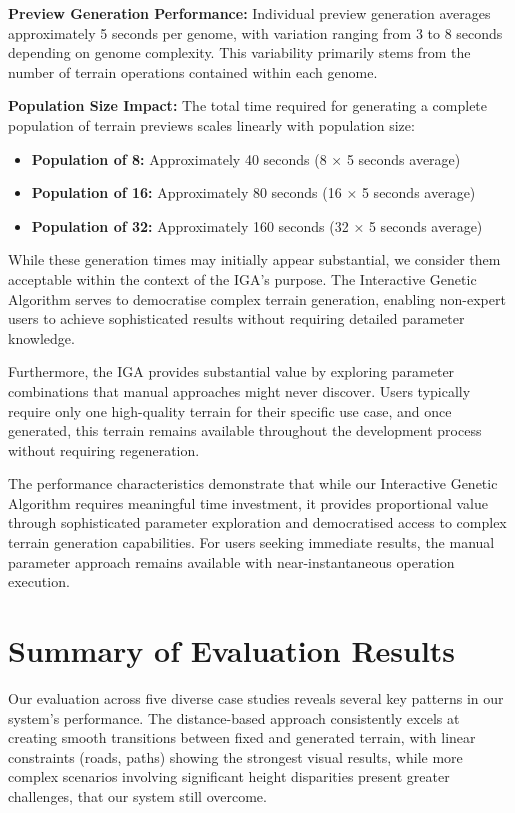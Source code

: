 \textbf{Preview Generation Performance:} Individual preview generation averages approximately 5 seconds per genome, with variation ranging from 3 to 8 seconds depending on genome complexity. This variability primarily stems from the number of terrain operations contained within each genome. 

\textbf{Population Size Impact:} The total time required for generating a complete population of terrain previews scales linearly with population size:

\begin{itemize}
    \item \textbf{Population of 8:} Approximately 40 seconds (8 × 5 seconds average)
    \item \textbf{Population of 16:} Approximately 80 seconds (16 × 5 seconds average)  
    \item \textbf{Population of 32:} Approximately 160 seconds (32 × 5 seconds average)
\end{itemize}

While these generation times may initially appear substantial, we consider them acceptable within the context of the IGA's purpose. The Interactive Genetic Algorithm serves to democratise complex terrain generation, enabling non-expert users to achieve sophisticated results without requiring detailed parameter knowledge.

Furthermore, the IGA provides substantial value by exploring parameter combinations that manual approaches might never discover. Users typically require only one high-quality terrain for their specific use case, and once generated, this terrain remains available throughout the development process without requiring regeneration.

The performance characteristics demonstrate that while our Interactive Genetic Algorithm requires meaningful time investment, it provides proportional value through sophisticated parameter exploration and democratised access to complex terrain generation capabilities. For users seeking immediate results, the manual parameter approach remains available with near-instantaneous operation execution.


\section{Summary of Evaluation Results}

Our evaluation across five diverse case studies reveals several key patterns in our system's performance. The distance-based approach consistently excels at creating smooth transitions between fixed and generated terrain, with linear constraints (roads, paths) showing the strongest visual results, while more complex scenarios involving significant height disparities present greater challenges, that our system still overcome. 

